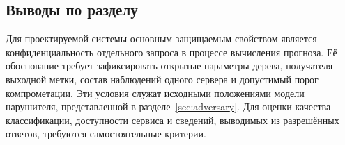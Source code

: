 \subsection{Выводы по разделу}

Для проектируемой системы основным защищаемым свойством является
конфиденциальность отдельного запроса в процессе вычисления прогноза.
Её обоснование требует зафиксировать открытые параметры дерева,
получателя выходной метки, состав наблюдений одного сервера и допустимый
порог компрометации. Эти условия служат исходными положениями модели
нарушителя, представленной в разделе~\ref{sec:adversary}. Для оценки
качества классификации, доступности сервиса и сведений, выводимых из
разрешённых ответов, требуются самостоятельные критерии.
